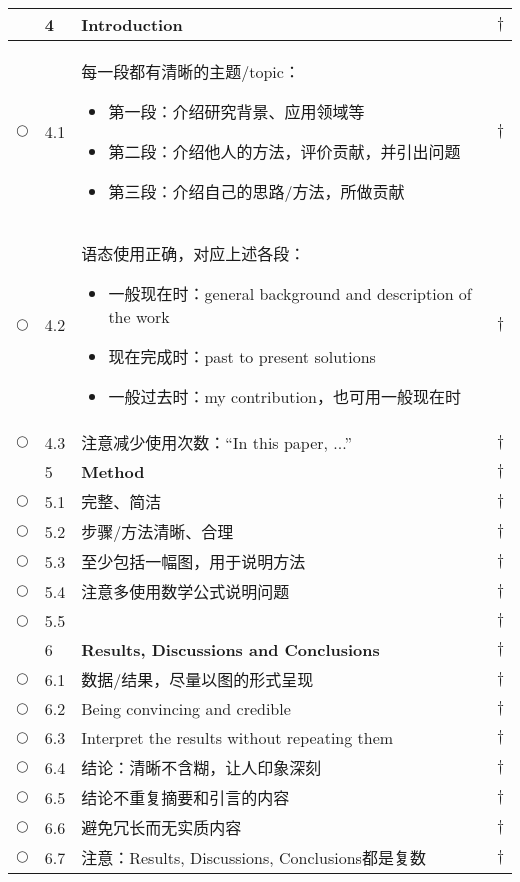 \documentclass{ctexart}
\begin{document}
\begin{center}
\begin{longtable}{|l|l|p{}|l|}
 & 4 & \textcolor[rgb]{0.00,0.00,1.00}{\textbf{Introduction}}& $\dagger$\\\hline
$\bigcirc$& 4.1 & 每一段都有清晰的主题/topic：
\begin{itemize}
  \item 第一段：介绍研究背景、应用领域等
  \item 第二段：介绍他人的方法，评价贡献，并引出问题
  \item 第三段：介绍自己的思路/方法，所做贡献
\end{itemize}
 & $\dagger$\\\hline
$\bigcirc$& 4.2 & 语态使用正确，对应上述各段： 
\begin{itemize}
  \item 一般现在时：general background and description of the work
  \item 现在完成时：past to present solutions
  \item 一般过去时：my contribution，也可用一般现在时
\end{itemize}

& $\dagger$\\\hline
$\bigcirc$& 4.3 & 注意减少使用次数：“In this paper, ...” & $\dagger$\\\hline
\hline
 & 5 & \textcolor[rgb]{0.00,0.00,1.00}{\textbf{Method}}& $\dagger$\\\hline
$\bigcirc$& 5.1 & 完整、简洁 & $\dagger$\\\hline
$\bigcirc$& 5.2 & 步骤/方法清晰、合理 & $\dagger$\\\hline
$\bigcirc$& 5.3 & 至少包括一幅图，用于说明方法 & $\dagger$\\\hline
$\bigcirc$& 5.4 & 注意多使用数学公式说明问题 & $\dagger$\\\hline
$\bigcirc$& 5.5 &  & $\dagger$\\\hline
\hline

 & 6 & \textcolor[rgb]{0.00,0.00,1.00}{\textbf{Results, Discussions and Conclusions}}& $\dagger$\\\hline
$\bigcirc$& 6.1 & 数据/结果，尽量以图的形式呈现 & $\dagger$\\\hline
$\bigcirc$& 6.2 & Being convincing and credible & $\dagger$\\\hline
$\bigcirc$& 6.3 & Interpret the results without repeating them & $\dagger$\\\hline
$\bigcirc$& 6.4 & 结论：清晰不含糊，让人印象深刻 & $\dagger$\\\hline
$\bigcirc$& 6.5 & 结论不重复摘要和引言的内容 & $\dagger$\\\hline
$\bigcirc$& 6.6 & 避免冗长而无实质内容 & $\dagger$\\\hline
$\bigcirc$& 6.7 & 注意：Results, Discussions, Conclusions都是复数 & $\dagger$\\\hline
\hline


\end{longtable}
\end{center}
\end{document}
